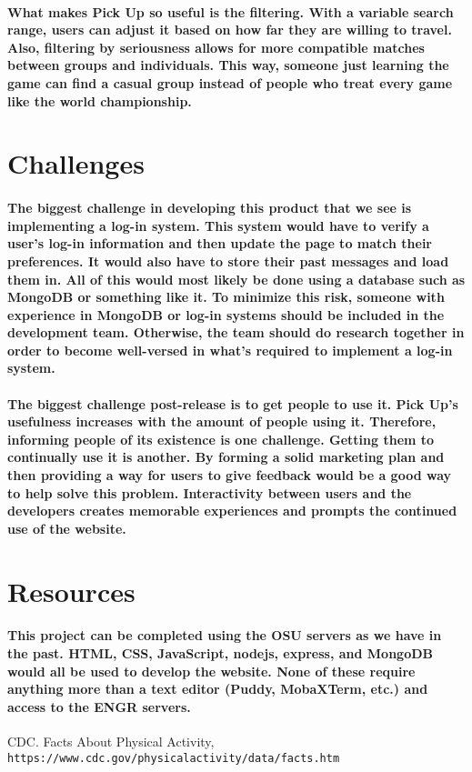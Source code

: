 \documentclass[12pt]{article}
\begin{document}
            \paragraph{What makes Pick Up so useful is the filtering. With a variable search range, users can adjust it based on how far they are willing to travel. Also, filtering by seriousness allows for more compatible matches between groups and individuals. This way, someone just learning the game can find a casual group instead of people who treat every game like the world championship.}
        \section{Challenges}
            \paragraph{The biggest challenge in developing this product that we see is implementing a log-in system. This system would have to verify a user's log-in information and then update the page to match their preferences. It would also have to store their past messages and load them in. All of this would most likely be done using a database such as MongoDB or something like it. To minimize this risk, someone with experience in MongoDB or log-in systems should be included in the development team. Otherwise, the team should do research together in order to become well-versed in what's required to implement a log-in system.}
            \paragraph{The biggest challenge post-release is to get people to use it. Pick Up's usefulness increases with the amount of people using it. Therefore, informing people of its existence is one challenge. Getting them to continually use it is another. By forming a solid marketing plan and then providing a way for users to give feedback would be a good way to help solve this problem. Interactivity between users and the developers creates memorable experiences and prompts the continued use of the website.}
        \section{Resources}
        		\paragraph{This project can be completed using the OSU servers as we have in the past. HTML, CSS, JavaScript, nodejs, express, and MongoDB would all be used to develop the website. None of these require anything more than a text editor (Puddy, MobaXTerm, etc.) and access to the ENGR servers.}
        
\begin{thebibliography}{9}
CDC. Facts About Physical Activity, 
\\\texttt{https://www.cdc.gov/physicalactivity/data/facts.htm}
\end{thebibliography}
\end{document}
